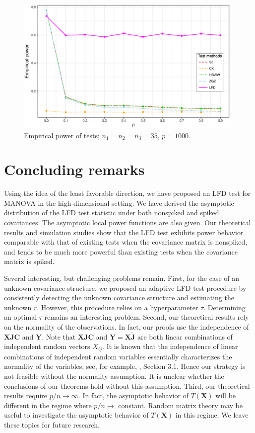 \documentclass[12pt]{article} %
\newcommand{\bX}{\mathbf{X}}
\newcommand{\bY}{\mathbf{Y}}
\newcommand{\bJ}{\mathbf{J}}
\newcommand{\bC}{\mathbf{C}}
\theoremstyle{definition}
\begin{document}
\begin{figure}[htbp]
    \centering
    \includegraphics[width=0.98\textwidth]{figure1}
    \caption{Empirical power of tests; $n_1=n_2=n_3=35$, $p=1000$.}
    \label{figure1}
\end{figure}





\section{Concluding remarks}\label{concluding}
\setcounter{equation}{0} %
Using the idea of the least favorable direction, we have proposed an LFD test for MANOVA in the high-dimensional setting.
We have derived the asymptotic distribution of the LFD test statistic under both nonspiked and spiked covariances.
The asymptotic local power functions are also given.
Our theoretical results and simulation studies show that the LFD test exhibits power behavior comparable with that of existing tests when the covariance matrix is nonspiked, and tends to be much more powerful than existing tests when the covariance matrix is spiked.

Several interesting, but challenging problems remain.
First, for the case of an unknown covariance structure,
we proposed an adaptive LFD test procedure by consistently detecting the unknown covariance structure and estimating the unknown $r$.
However, this procedure relies on a hyperparameter $\tau$. 
Determining an optimal $\tau$ remains an interesting problem.
Second, our theoretical results rely on the normality of the observations.
In fact, our proofs use the independence of $\bX \bJ \bC$ and $\bY$.
Note that $\bX \bJ \bC$ and $\bY =\bX \tilde{\bJ}$ are both linear combinations of independent random vectors $X_{ij}$.
It is known that the independence of linear combinations of independent random variables essentially characterizes the normality of the variables; see, for example, \cite{KAGAN}, Section 3.1.
Hence our strategy is not feasible without the normality assumption.
It is unclear whether the conclusions of our theorems hold without this assumption.
Third, our theoretical results require $p/n \to \infty$.
In fact, the asymptotic behavior of $T(\bX)$ will be different in the regime where $p/n \to$ constant.
Random matrix theory may be useful to investigate the asymptotic behavior of $T(\bX)$ in this regime.
We leave these topics for future research.
\end{document}

